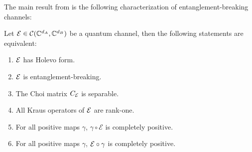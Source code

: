 The main result from \cite{Horodecki2003} is the following characterization of entanglement-breaking channels:
\begin{theorem}
    Let $\mathcal E \in \mathcal C(\mathbb{C}^{d_A},\mathbb{C}^{d_B})$ be a quantum channel, then the following statements are equivalent:
    \begin{enumerate}
        \item $\mathcal E$ has Holevo form.
        \item $\mathcal E$ is entanglement-breaking.
        \item The Choi matrix $C_{\mathcal E}$ is separable.
        \item All Kraus operators of $\mathcal E$ are rank-one.
        \item For all positive maps $\gamma$,  $\gamma \circ \mathcal{E}$ is completely positive.
        \item For all positive maps $\gamma$,  $\mathcal E\circ\gamma$ is completely positive.
    \end{enumerate}
\end{theorem}
